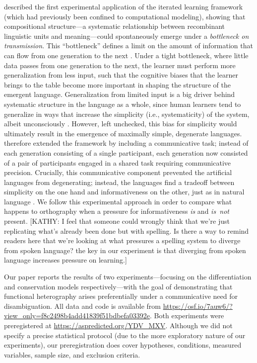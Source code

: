 \documentclass[doc,biblatex]{apa7}
\begin{document}
\textcite{Kirby:2008} described the first experimental application of the iterated learning framework (which had previously been confined to computational modeling), showing that compositional structure---a systematic relationship between recombinant linguistic units and meaning---could spontaneously emerge under a \textit{bottleneck on transmission}. This ``bottleneck'' defines a limit on the amount of information that can flow from one generation to the next \parencite{Brighton:2002}. Under a tight bottleneck, where little data passes from one generation to the next, the learner must perform more generalization from less input, such that the cognitive biases that the learner brings to the table become more important in shaping the structure of the emergent language. Generalization from limited input is a big driver behind systematic structure in the language as a whole, since human learners tend to generalize in ways that increase the simplicity (i.e., systematicity) of the system, albeit unconsciously \parencite{Culbertson:2016}. However, left unchecked, this bias for simplicity would ultimately result in the emergence of maximally simple, degenerate languages. \textcite{Kirby:2015} therefore extended the framework by including a communicative task; instead of each generation consisting of a single participant, each generation now consisted of a pair of participants engaged in a shared task requiring communicative precision. Crucially, this communicative component prevented the artificial languages from degenerating; instead, the languages find a tradeoff between simplicity on the one hand and informativeness on the other, just as in natural language \parencite{Mollica:2021, KempRegier:2012, Kemp:2018, Regier:2015, Zaslavsky:2018}. We follow this experimental approach in order to compare what happens to orthography when a pressure for informativeness \textit{is} and \textit{is~not} present. [KATHY: I feel that someone could wrongly think that we're just replicating what's already been done but with spelling.  Is there a way to remind readers here that we're looking at what pressures a spelling system to diverge from spoken language?  the key in our experiment is that diverging from spoken language increases pressure on learning.]

Our paper reports the results of two experiments---focusing on the differentiation and conservation models respectively---with the goal of demonstrating that functional heterography arises preferentially under a communicative need for disambiguation. All data and code is available from \url{https://osf.io/7auw6/?view_only=f8c2498b4add41839f51bdbefa03392e}. Both experiments were preregistered at \url{https://aspredicted.org/YDV_MXV}. Although we did not specify a precise statistical protocol (due to the more exploratory nature of our experiments), our preregistration does cover hypotheses, conditions, measured variables, sample size, and exclusion criteria.
\end{document}
